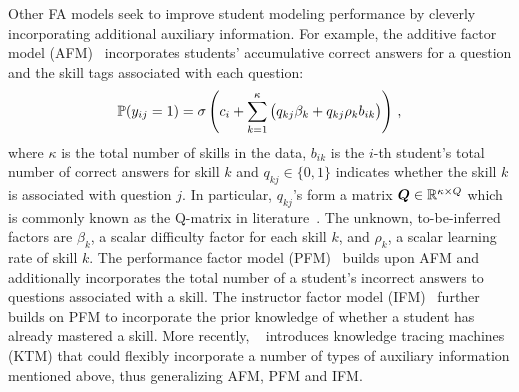 Other FA models seek to improve student modeling performance by cleverly
incorporating additional auxiliary information.
For example, the additive factor model (AFM)~\cite{LFA} incorporates students'
accumulative correct answers for a question and the skill tags associated with
each question:
\begin{align}
    \begin{split}
        \mathbb{P}(y_{ij}=1) = \sigma\left(c_i + \sum_{k=1}^\kappa\big( q_{kj}\beta_k + q_{kj}\rho_k b_{ik} \big)\right)\,,\label{eq:laf}
    \end{split}
\end{align}
where $\kappa$ is the total number of skills in the data, $b_{ik}$ is the $i$-th student's total number of correct answers for skill $k$ and $q_{kj}\in\{0,1\}$ indicates whether the skill $k$ is associated with question $j$. In particular, $q_{kj}$'s form a matrix ${\bm{Q}}\in\mathbb{R}^{\kappa\times Q}$ which is commonly known as the Q-matrix in literature~\cite{qmatrix}. The unknown, to-be-inferred factors are $\beta_k$, a scalar difficulty factor for each skill $k$, and $\rho_k$, a scalar learning rate of skill $k$.
%
The performance factor model (PFM)~\cite{PFA} builds upon AFM and additionally
incorporates the total number of a student's incorrect answers to questions
associated with a skill. The instructor factor model
(IFM)~\cite{chi2011instructional} further builds on PFM to incorporate the
prior knowledge of whether a student has already mastered a skill. More
recently, ~\cite{vie2019knowledge} introduces knowledge tracing machines (KTM)
that could flexibly incorporate a number of types of auxiliary information mentioned
above, thus generalizing AFM, PFM and IFM.

